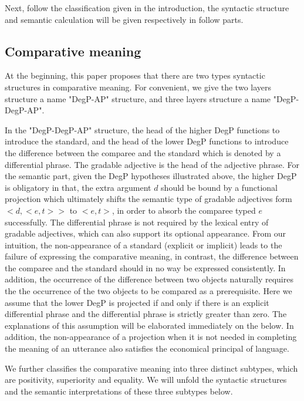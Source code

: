\documentclass{ctexart}
\begin{document}
\noindent
Next, follow the classification given in the introduction, the syntactic structure and semantic calculation will be given respectively in follow parts.

\subsection{Comparative meaning}

\noindent
At the beginning, this paper proposes that there are two types syntactic structures in comparative meaning. For convenient, we give the two layers structure a name "DegP-AP" structure, and three layers structure a name "DegP-DegP-AP". 

In the "DegP-DegP-AP" structure, the head of the higher DegP functions to introduce the standard, and the head of the lower DegP functions to introduce the difference between the comparee and the standard which is denoted by a differential phrase. The gradable adjective is the head of the adjective phrase. For the semantic part, given the DegP hypotheses illustrated above, the higher DegP is obligatory in that, the extra argument $d$ should be bound by a functional projection which ultimately shifts the semantic type of gradable adjectives form $<d,<e,t>>$ to $<e,t>$, in order to absorb the comparee typed $e$ successfully. The differential phrase is not required by the lexical entry of gradable adjectives, which can also support its optional appearance. From our intuition, the non-appearance of a standard (explicit or implicit) leads to the failure of expressing the comparative meaning, in contrast, the difference between the comparee and the standard should in no way be expressed consistently. In addition, the occurrence of the difference between two objects naturally requires the the occurrence of the two objects to be compared as a prerequisite. Here we assume that the lower DegP is projected if and only if there is an explicit differential phrase and the differential phrase is strictly greater than zero. The explanations of this assumption will be elaborated immediately on the below. In addition, the non-appearance of a projection when it is not needed in completing the meaning of an utterance also satisfies the economical principal of language.

We further classifies the comparative meaning into three distinct subtypes, which are positivity, superiority and equality. We will unfold the syntactic structures and the semantic interpretations of these three subtypes below.
\end{document}
